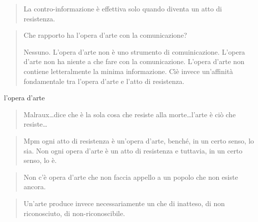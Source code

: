 \begin{quote}
\begin{sf}
\small
  La contro-informazione è effettiva solo quando diventa un atto di resistenza.
  \cite{deleuze2009}
  \end{sf}
\end{quote}



\begin{quote}
\begin{sf}
\small
  Che rapporto ha l'opera d'arte con la comunicazione?

  Nessuno. L'opera d'arte non è uno strumento di comuinicazione. L'opera d'arte
  non ha niente a che fare con la comunicazione. L'opera d'arte non contiene
  letteralmente la minima informazione. Cìè invece un'affinità fondamentale tra
  l'opera d'arte e l'atto di resistenza.
  \cite{deleuze2009}
  \end{sf}
\end{quote}

l'opera d'arte

\begin{quote}
\begin{sf}
\small
  Malraux\ldots dice che è la sola cosa che resiste alla morte\ldots l'arte
  è ciò che resiste\ldots
  \cite{deleuze2009}
  \end{sf}
\end{quote}

\begin{quote}
\begin{sf}
\small
  Mpm ogni atto di resistenza è un'opera d'arte, benché, in un certo senso, lo
  sia. Non ogni opera d'arte è un atto di resistenza e tuttavia, in un certo
  senso, lo è.
  \cite{deleuze2009}
  \end{sf}
\end{quote}

\begin{quote}
\begin{sf}
\small
  Non c'è opera d'arte che non faccia appello a un popolo che non esiste ancora.
  \cite{deleuze2009}
  \end{sf}
\end{quote}

\begin{quote}
\begin{sf}
\small
  Un'arte produce invece necessariamente un che di inatteso, di non riconosciuto,
  di non-riconoscibile.
  \cite{deleuze2009}
  \end{sf}
\end{quote}

